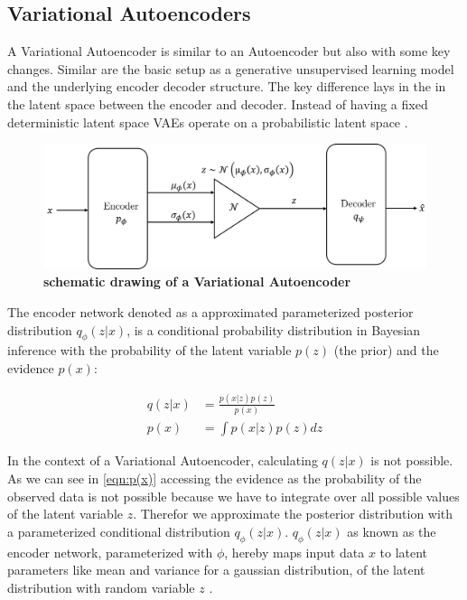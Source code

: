 \subsection{Variational Autoencoders}\label{sec:VAE}

A Variational Autoencoder is similar to an Autoencoder but also with some key changes. Similar are the basic setup as a generative unsupervised learning model and the underlying encoder decoder structure. The key difference lays in the in the latent space between the encoder and decoder. Instead of having a fixed deterministic latent space VAEs operate on a probabilistic latent space \cite{pml2Book}.
\begin{figure}
    \centering
    \includegraphics[width=0.7\linewidth]{figures/background/VAE.png}
    \caption[Variational Autoencoder schematics]{\textbf{schematic drawing of a Variational Autoencoder}}
    \label{fig:Variational_Autoencoder_schematics}
\end{figure}

The encoder network denoted as a approximated parameterized posterior distribution $q_\phi(z|x)$, is a conditional probability distribution in Bayesian inference with the probability of the latent variable $p(z)$ (the prior) and the evidence $p(x)$: 

\begin{align}
	q(z|x) &= \frac{p(x|z) p(z)}{p(x)} \label{eqn:Bayesian-inference}\\
	p(x) &= \int p(x|z)p(z) dz \label{eqn:p(x)}
\end{align}

In the context of a Variational Autoencoder, calculating $q(z|x)$ is not possible. As we can see in \eqref{eqn:p(x)} accessing the evidence as the probability of the observed data is not possible because we have to integrate over all possible values of the latent variable $z$. Therefor we approximate the posterior distribution with a parameterized conditional distribution $q_\phi(z|x)$. $q_\phi(z|x)$ as known as the encoder network, parameterized with $\phi$, hereby maps input data $x$ to latent parameters like mean and variance for a gaussian distribution, of the latent distribution with random variable $z$ \cite{pml2Book}. 


